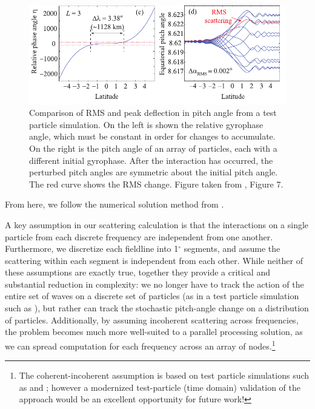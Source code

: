 \begin{figure}[t]
\begin{center}
\includegraphics{figures/Bortnik_RMS_scattering.pdf}
\caption[RMS pitch angle scattering from a test particle simulation]{Comparison of RMS and peak deflection in pitch angle from a test particle simulation. On the left is shown the relative gyrophase angle, which must be constant in order for changes to accumulate. On the right is the pitch angle of an array of particles, each with a different initial gyrophase. After the interaction has occurred, the perturbed pitch angles are symmetric about the initial pitch angle. The red curve shows the RMS change. Figure taken from \cite{Bortnik2006}, Figure 7.}
\label{fig:test_particle_sims}
\end{center}
\end{figure}

From here, we follow the numerical solution method from \cite{Bortnik2005, Bortnik2006}. 

A key assumption in our scattering calculation is that the interactions on a single particle from each discrete frequency are independent from one another. Furthermore, we discretize each fieldline into 1$^\circ$ segments, and assume the scattering within each segment is independent from each other. While neither of these assumptions are exactly true, together they provide a critical and substantial reduction in complexity: we no longer have to track the action of the entire set of waves on a discrete set of particles (as in a test particle simulation such as \cite{Chang1985}), but rather can track the stochastic pitch-angle change on a distribution of particles. Additionally, by assuming incoherent scattering across frequencies, the problem becomes much more well-suited to a parallel processing solution, as we can spread computation for each frequency across an array of nodes.\footnote{The coherent-incoherent assumption is based on test particle simulations such as \cite{Chang1985} and \cite{Ristic1993}; however a modernized test-particle (time domain) validation of the approach would be an excellent opportunity for future work!}

